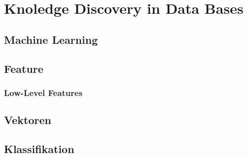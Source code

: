 \chapter{Knoledge Discovery in Data Bases}

\blindtext

\section{Machine Learning}

\blindtext

\section{Feature}

\blindtext

\subsection{Low-Level Features}

\blindtext

\section{Vektoren}

\blindtext

\section{Klassifikation}

\blindtext